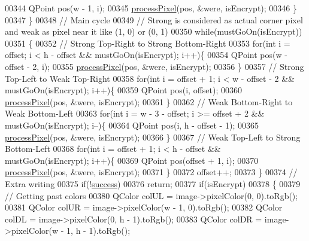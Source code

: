 \begin{DoxyCode}
00344             QPoint pos(w - 1, i);
00345             \hyperlink{class_model_p_c_a1171f9fe1550133dc9053a46b4e5bcfd}{processPixel}(pos, &were, isEncrypt);
00346         \}
00347     \}
00348     \textcolor{comment}{// Main cycle}
00349     \textcolor{comment}{// Strong is considered as actual corner pixel and weak as pixel near it like (1, 0) or (0, 1)}
00350     \textcolor{keywordflow}{while}(mustGoOn(isEncrypt))
00351     \{
00352         \textcolor{comment}{// Strong Top-Right to Strong Bottom-Right}
00353         \textcolor{keywordflow}{for}(\textcolor{keywordtype}{int} i = offset; i < h - offset && mustGoOn(isEncrypt); i++)\{
00354             QPoint pos(w - offset - 2, i);
00355             \hyperlink{class_model_p_c_a1171f9fe1550133dc9053a46b4e5bcfd}{processPixel}(pos, &were, isEncrypt);
00356         \}
00357         \textcolor{comment}{// Strong Top-Left to Weak Top-Right}
00358         \textcolor{keywordflow}{for}(\textcolor{keywordtype}{int} i = offset + 1; i < w - offset - 2 && mustGoOn(isEncrypt); i++)\{
00359             QPoint pos(i, offset);
00360             \hyperlink{class_model_p_c_a1171f9fe1550133dc9053a46b4e5bcfd}{processPixel}(pos, &were, isEncrypt);
00361         \}
00362         \textcolor{comment}{// Weak Bottom-Right to Weak Bottom-Left}
00363         \textcolor{keywordflow}{for}(\textcolor{keywordtype}{int} i = w - 3 - offset; i >= offset + 2 && mustGoOn(isEncrypt); i--)\{
00364             QPoint pos(i, h - offset - 1);
00365             \hyperlink{class_model_p_c_a1171f9fe1550133dc9053a46b4e5bcfd}{processPixel}(pos, &were, isEncrypt);
00366         \}
00367         \textcolor{comment}{// Weak Top-Left to Strong Bottom-Left}
00368         \textcolor{keywordflow}{for}(\textcolor{keywordtype}{int} i = offset + 1; i < h - offset && mustGoOn(isEncrypt); i++)\{
00369             QPoint pos(offset + 1, i);
00370             \hyperlink{class_model_p_c_a1171f9fe1550133dc9053a46b4e5bcfd}{processPixel}(pos, &were, isEncrypt);
00371         \}
00372         offset++;
00373     \}
00374     \textcolor{comment}{// Extra writing}
00375     \textcolor{keywordflow}{if}(!\hyperlink{class_model_p_c_a945ffbbc44a832b953c191debd448f4c}{success})
00376         \textcolor{keywordflow}{return};
00377     \textcolor{keywordflow}{if}(isEncrypt)
00378     \{
00379         \textcolor{comment}{// Getting past colors}
00380         QColor colUL = image->pixelColor(0, 0).toRgb();
00381         QColor colUR = image->pixelColor(w - 1, 0).toRgb();
00382         QColor colDL = image->pixelColor(0, h - 1).toRgb();
00383         QColor colDR = image->pixelColor(w - 1, h - 1).toRgb();

\end{DoxyCode}
